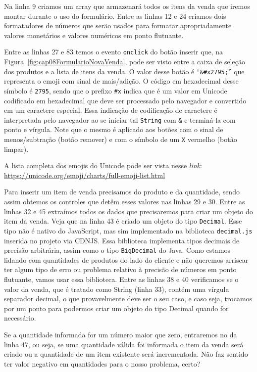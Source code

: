 Na linha 9 criamos um array que armazenará todos os itens da venda que iremos montar durante o uso do formulário. Entre as linhas 12 e 24 criamos dois formatadores de números que serão usados para formatar apropriadamente valores monetários e valores numéricos em ponto flutuante.

Entre as linhas 27 e 83 temos o evento \texttt{onclick} do botão inserir que, na Figura~\ref{fig:cap08FormularioNovaVenda}, pode ser visto entre a caixa de seleção dos produtos e a lista de itens da venda. O valor desse botão é ``\texttt{\&\#x2795;}'' que representa o emoji com sinal de mais/adição. O código em hexadecimal desse símbolo é \texttt{2795}, sendo que o prefixo \texttt{\#x} indica que é um valor em Unicode codificado em hexadecimal que deve ser processado pelo navegador e convertido em um caractere especial. Essa indicação de codificação de caractere é interpretada pelo navegador ao se iniciar tal \texttt{String} com \texttt{\&} e terminá-la com ponto e vírgula. Note que o mesmo é aplicado aos botões com o sinal de menos/subtração (botão remover) e com o símbolo de um \texttt{X} vermelho (botão limpar).

\begin{saibaMais}
    A lista completa dos emojis do Unicode pode ser vista nesse \textit{link}: \url{https://unicode.org/emoji/charts/full-emoji-list.html}
\end{saibaMais}

Para inserir um item de venda precisamos do produto e da quantidade, sendo assim obtemos os controles que detêm esses valores nas linhas 29 e 30. Entre as linhas 32 e 45 extraímos todos os dados que precisaremos para criar um objeto do item da venda. Veja que na linha 43 é criado um objeto do tipo \texttt{Decimal}. Esse tipo não é nativo do JavaScript, mas sim implementado na biblioteca \texttt{decimal.js} inserida no projeto via CDNJS. Essa biblioteca implementa tipos decimais de precisão arbitrária, assim como o tipo \texttt{BigDecimal} do Java. Como estamos lidando com quantidades de produtos do lado do cliente e não queremos arriscar ter algum tipo de erro ou problema relativo à precisão de números em ponto flutuante, vamos usar essa biblioteca. Entre as linhas 38 e 40 verificamos se o valor da venda, que é tratado como String (linha 33), contém uma vírgula separador decimal, o que provavelmente deve ser o seu caso, e caso seja, trocamos por um ponto para podermos criar um objeto do tipo Decimal quando for necessário.

Se a quantidade informada for um número maior que zero, entraremos no  da linha 47, ou seja, se uma quantidade válida foi informada o item da venda será criado ou a quantidade de um item existente será incrementada. Não faz sentido ter valor negativo em quantidades para o nosso problema, certo?

